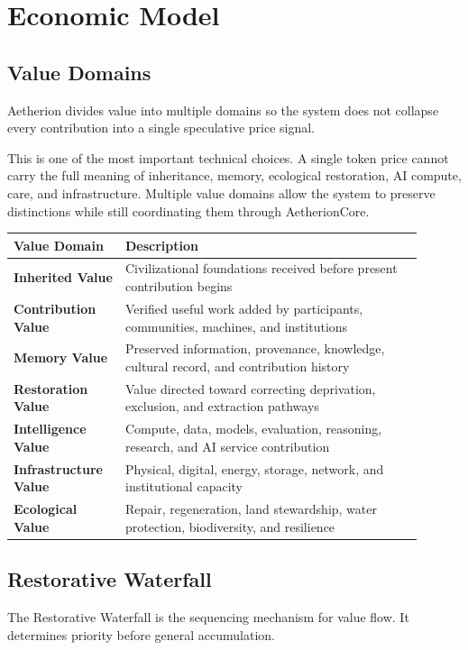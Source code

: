 \documentclass[12pt]{article}
\begin{document}
\section{Economic Model}

\subsection{Value Domains}

Aetherion divides value into multiple domains so the system does not collapse every contribution into a single speculative price signal.

This is one of the most important technical choices. A single token price cannot carry the full meaning of inheritance, memory, ecological restoration, AI compute, care, and infrastructure. Multiple value domains allow the system to preserve distinctions while still coordinating them through AetherionCore.

\begin{longtable}{>{\bfseries}p{0.24\linewidth}p{0.66\linewidth}}
\toprule
Value Domain & Description \\
\midrule
Inherited Value & Civilizational foundations received before present contribution begins \\
Contribution Value & Verified useful work added by participants, communities, machines, and institutions \\
Memory Value & Preserved information, provenance, knowledge, cultural record, and contribution history \\
Restoration Value & Value directed toward correcting deprivation, exclusion, and extraction pathways \\
Intelligence Value & Compute, data, models, evaluation, reasoning, research, and AI service contribution \\
Infrastructure Value & Physical, digital, energy, storage, network, and institutional capacity \\
Ecological Value & Repair, regeneration, land stewardship, water protection, biodiversity, and resilience \\
\bottomrule
\end{longtable}

\subsection{Restorative Waterfall}

The Restorative Waterfall is the sequencing mechanism for value flow. It determines priority before general accumulation.
\end{document}
